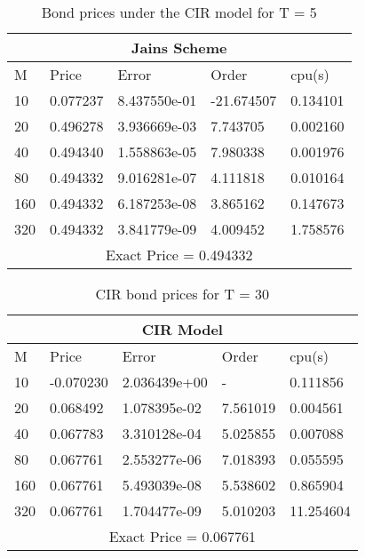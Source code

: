 \documentclass[11pt]{article}
\begin{document}
\begin{table}[htp]
\begin{tabular}{ |p{2cm}|p{3cm}|p{3cm}|p{3cm}|p{3cm}|  }
 \hline
 \multicolumn{5}{|c|}{Jains Scheme} \\
 \hline
 M & Price & Error & Order & cpu(s)\\
 \hline
 10 & 0.077237 & 8.437550e-01 & -21.674507 & 0.134101\\
20 & 0.496278 & 3.936669e-03 & 7.743705 & 0.002160\\
40 & 0.494340 & 1.558863e-05 & 7.980338 & 0.001976\\
80 & 0.494332 & 9.016281e-07 & 4.111818 & 0.010164\\
160 & 0.494332 & 6.187253e-08 & 3.865162 & 0.147673\\
320 & 0.494332 & 3.841779e-09 & 4.009452 & 1.758576\\
 \hline
 \multicolumn{5}{|c|}{Exact Price = 0.494332} \\
 \hline
 
\end{tabular}
\caption{ Bond prices under the CIR model for T = 5}

\end{table}

\begin{table}[htp]
\begin{tabular}{ |p{2cm}|p{3cm}|p{3cm}|p{3cm}|p{3cm}|  }
 \hline
 \multicolumn{5}{|c|}{CIR Model} \\
 \hline
 M & Price & Error & Order & cpu(s)\\
 \hline
 10 & -0.070230 & 2.036439e+00 &  - & 0.111856\\
20 & 0.068492 & 1.078395e-02 &  7.561019 & 0.004561\\
40 & 0.067783 & 3.310128e-04 &  5.025855 & 0.007088\\
80 & 0.067761 & 2.553277e-06 &  7.018393 & 0.055595\\
160 & 0.067761 & 5.493039e-08 &  5.538602 & 0.865904\\
320 & 0.067761 & 1.704477e-09 &  5.010203 & 11.254604\\
 \hline
 \multicolumn{5}{|c|}{Exact Price = 0.067761} \\
 \hline
 
\end{tabular}
\caption{ CIR bond prices for T = 30}

\end{table}
\end{document}
